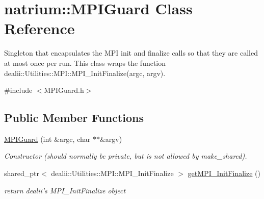 \hypertarget{classnatrium_1_1MPIGuard}{
\section{natrium::MPIGuard Class Reference}
\label{classnatrium_1_1MPIGuard}
}


Singleton that encapsulates the MPI init and finalize calls so that they are called at most once per run. This class wraps the function dealii::Utilities::MPI::MPI\_\-InitFinalize(argc, argv).  


{\ttfamily \#include $<$MPIGuard.h$>$}\subsection*{Public Member Functions}
\begin{DoxyCompactItemize}
\item 
\hypertarget{classnatrium_1_1MPIGuard_a1e07fafea3f7724d0d2dd9c106e1a44b}{
\hyperlink{classnatrium_1_1MPIGuard_a1e07fafea3f7724d0d2dd9c106e1a44b}{MPIGuard} (int \&argc, char $\ast$$\ast$\&argv)}
\label{classnatrium_1_1MPIGuard_a1e07fafea3f7724d0d2dd9c106e1a44b}

\begin{DoxyCompactList}\small\item\em Constructor (should normally be private, but is not allowed by make\_\-shared). \item\end{DoxyCompactList}\item 
\hypertarget{classnatrium_1_1MPIGuard_ab999564027da999d5038c67a4a313d78}{
shared\_\-ptr$<$ dealii::Utilities::MPI::MPI\_\-InitFinalize $>$ \hyperlink{classnatrium_1_1MPIGuard_ab999564027da999d5038c67a4a313d78}{getMPI\_\-InitFinalize} ()}
\label{classnatrium_1_1MPIGuard_ab999564027da999d5038c67a4a313d78}

\begin{DoxyCompactList}\small\item\em return dealii's MPI\_\-InitFinalize object \item\end{DoxyCompactList}\end{DoxyCompactItemize}
